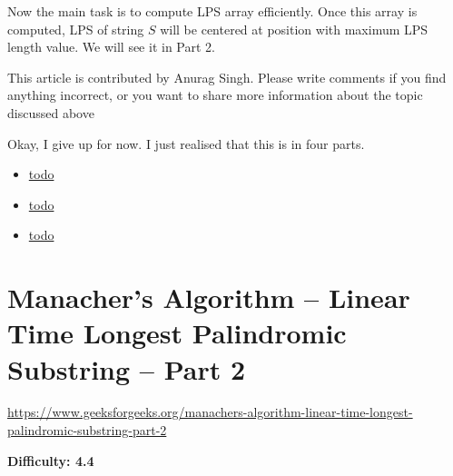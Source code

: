 Now the main task is to compute LPS array efficiently. Once this array is
computed, LPS of string $S$ will be centered at position with maximum LPS
length value. We will see it in Part 2.

This article is contributed by Anurag Singh. Please write comments if you
find anything incorrect, or you want to share more information about the
topic discussed above

\RayNotesBegin

Okay, I give up for now. I just realised that this is in four parts.

\begin{itemize}%
\item \url{todo}
\item \url{todo}
\item \url{todo}
\end{itemize}

\RayNotesEnd

%
%
%
%
%




\section{Manacher's Algorithm -- Linear Time Longest Palindromic Substring
  -- Part 2
  \label{secLPSStrGFGManacherPt2}}

\url{https://www.geeksforgeeks.org/manachers-algorithm-linear-time-longest-palindromic-substring-part-2}

\textbf{Difficulty: 4.4}


